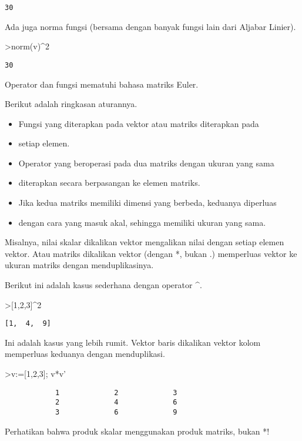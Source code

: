 \documentclass[
]{book}
\begin{document}
\begin{verbatim}
30
\end{verbatim}

Ada juga norma fungsi (bersama dengan banyak fungsi lain dari Aljabar Linier).

\textgreater norm(v)\^{}2

\begin{verbatim}
30
\end{verbatim}

Operator dan fungsi mematuhi bahasa matriks Euler.

Berikut adalah ringkasan aturannya.

\begin{itemize}
\item
  Fungsi yang diterapkan pada vektor atau matriks diterapkan pada
\item
  setiap elemen.
\item
  Operator yang beroperasi pada dua matriks dengan ukuran yang sama
\item
  diterapkan secara berpasangan ke elemen matriks.
\item
  Jika kedua matriks memiliki dimensi yang berbeda, keduanya diperluas
\item
  dengan cara yang masuk akal, sehingga memiliki ukuran yang sama.
\end{itemize}

Misalnya, nilai skalar dikalikan vektor mengalikan nilai dengan setiap elemen vektor. Atau matriks dikalikan vektor (dengan *, bukan .) memperluas vektor ke ukuran matriks dengan menduplikasinya.

Berikut ini adalah kasus sederhana dengan operator \^{}.

\textgreater{[}1,2,3{]}\^{}2

\begin{verbatim}
[1,  4,  9]
\end{verbatim}

Ini adalah kasus yang lebih rumit. Vektor baris dikalikan vektor kolom memperluas keduanya dengan menduplikasi.

\textgreater v:={[}1,2,3{]}; v*v'

\begin{verbatim}
            1             2             3 
            2             4             6 
            3             6             9 
\end{verbatim}

Perhatikan bahwa produk skalar menggunakan produk matriks, bukan *!
\end{document}
